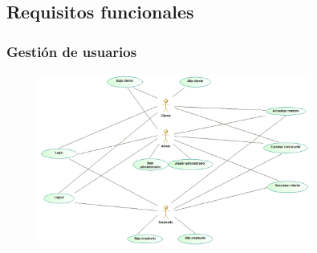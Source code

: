\subsection{Requisitos funcionales}
\subsubsection{Gestión de usuarios}%
\begin{figure}[H]
    \centering
    \includegraphics[width = 0.8\textwidth]{Use_Cases/Gestion_Usuarios.png}
\end{figure}
\newpage
